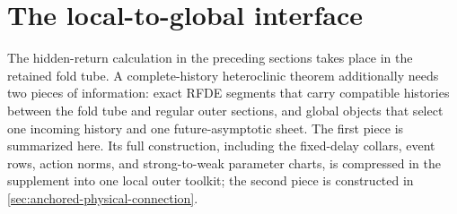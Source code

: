 \section{The local-to-global interface}
\label{sec:main-outer-interface}

The hidden-return calculation in the preceding sections takes place in the
retained fold tube.  A complete-history heteroclinic theorem additionally
needs two pieces of information: exact RFDE segments that carry compatible
histories between the fold tube and regular outer sections, and global
objects that select one incoming history and one future-asymptotic sheet.
The first piece is summarized here.  Its full construction, including the
fixed-delay collars, event rows, action norms, and strong-to-weak parameter
charts, is compressed in the supplement into one local outer toolkit; the second piece is
constructed in \cref{sec:anchored-physical-connection}.

